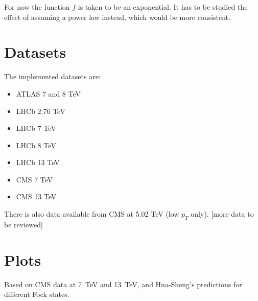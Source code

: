 \documentclass[a4paper,10pt]{article}
\newcommand{\pt}{\ensuremath{p_T}\xspace}
\begin{document}
 For now the function $f$ is taken to be an exponential. It has to be studied the effect of assuming a power law instead, which would be more consistent.
 
 
 \section{Datasets}
 
 The implemented datasets are:
 
 \begin{itemize}
  \item ATLAS 7 and 8 TeV~\cite{atlas78}
  \item LHCb 2.76 TeV~\cite{lhcb276}
  \item LHCb 7 TeV~\cite{lhcb7}
  \item LHCb 8 TeV~\cite{lhcb8}
  \item LHCb 13 TeV~\cite{lhcb13}
  \item CMS 7 TeV~\cite{cms7}
  \item CMS 13 TeV~\cite{cms13}
 \end{itemize}

 There is also data available from CMS at 5.02 TeV (low \pt only). [more data to be reviewed]
 
 \section{Plots}
 
 Based on CMS data at 7~TeV and 13~TeV, and Hua-Sheng's predictions for different Fock states.
 
\end{document}
